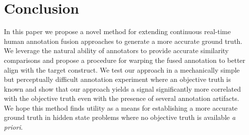 \documentclass[times,twocolumn,final,authoryear]{elsarticle}
\begin{document}
\section{Conclusion}
In this paper we propose a novel method for extending continuous real-time human annotation fusion approaches to generate a more accurate ground truth.  We leverage the natural ability of annotators to provide accurate similarity comparisons and propose a procedure for warping the fused annotation to better align with the target construct.  We test our approach in a mechanically simple but perceptually difficult annotation experiment where an objective truth is known and show that our approach yields a signal significantly more correlated with the objective truth even with the presence of several annotation artifacts.  We hope this method finds utility as a means for establishing a more accurate ground truth in hidden state problems where no objective truth is available \textit{a priori}.

\end{document}
